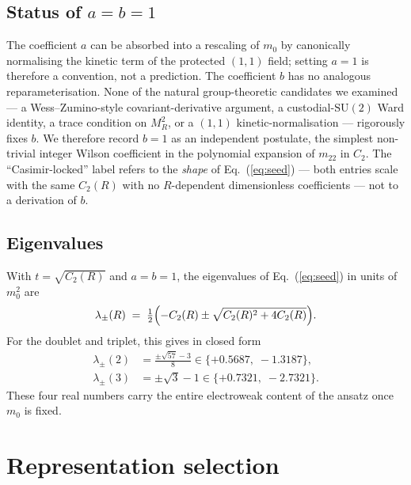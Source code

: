 \documentclass[%
 aps,
 prd,
 reprint,
 nofootinbib,
 superscriptaddress,
 amsmath,
 amssymb,
]{revtex4-2}
\begin{document}
\subsection{Status of $a=b=1$}

The coefficient $a$ can be absorbed into a rescaling of $m_0$ by canonically normalising the kinetic term of the protected $(1,1)$ field; setting $a=1$ is therefore a convention, not a prediction. The coefficient $b$ has no analogous reparameterisation. None of the natural group-theoretic candidates we examined --- a Wess--Zumino-style covariant-derivative argument, a custodial-$\mathrm{SU}(2)$ Ward identity, a trace condition on $M_R^2$, or a $(1,1)$ kinetic-normalisation --- rigorously fixes $b$. We therefore record $b=1$ as an independent postulate, the simplest non-trivial integer Wilson coefficient in the polynomial expansion of $m_{22}$ in $C_2$. The ``Casimir-locked'' label refers to the \emph{shape} of Eq.~(\ref{eq:seed}) --- both entries scale with the same $C_2(R)$ with no $R$-dependent dimensionless coefficients --- not to a derivation of $b$.

\subsection{Eigenvalues}

With $t=\sqrt{C_2(R)}$ and $a=b=1$, the eigenvalues of Eq.~(\ref{eq:seed}) in units of $m_0^2$ are
\begin{equation}\label{eq:eig}
\lambda_{\pm}(R) \;=\; \tfrac{1}{2}\Bigl(-C_2(R) \pm \sqrt{C_2(R)^2 + 4 C_2(R)}\Bigr).
\end{equation}
For the doublet and triplet, this gives in closed form
\begin{equation}\label{eq:eig23}
\begin{aligned}
\lambda_{\pm}(2) &= \tfrac{\pm\sqrt{57}-3}{8} \in \{+0.5687,\;-1.3187\},\\
\lambda_{\pm}(3) &= \pm\sqrt{3}-1 \in \{+0.7321,\;-2.7321\}.
\end{aligned}
\end{equation}
These four real numbers carry the entire electroweak content of the ansatz once $m_0$ is fixed.

\section{Representation selection}\label{sec:repsel}
\end{document}
